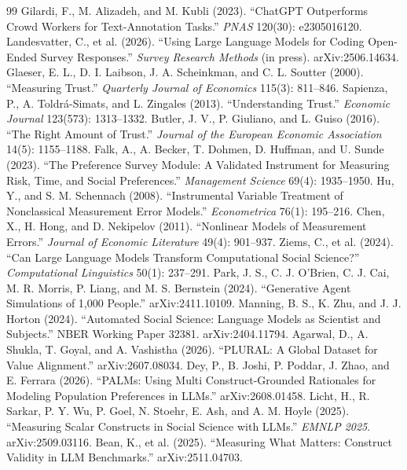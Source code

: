 \documentclass[10pt,letterpaper]{article}
\begin{document}
\begin{thebibliography}{99}
 Gilardi, F., M. Alizadeh, and M. Kubli (2023). ``ChatGPT Outperforms Crowd Workers for Text-Annotation Tasks.'' \textit{PNAS} 120(30): e2305016120.
 Landesvatter, C., et al. (2026). ``Using Large Language Models for Coding Open-Ended Survey Responses.'' \textit{Survey Research Methods} (in press). arXiv:2506.14634.
 Glaeser, E. L., D. I. Laibson, J. A. Scheinkman, and C. L. Soutter (2000). ``Measuring Trust.'' \textit{Quarterly Journal of Economics} 115(3): 811--846.
 Sapienza, P., A. Toldr\'a-Simats, and L. Zingales (2013). ``Understanding Trust.'' \textit{Economic Journal} 123(573): 1313--1332.
 Butler, J. V., P. Giuliano, and L. Guiso (2016). ``The Right Amount of Trust.'' \textit{Journal of the European Economic Association} 14(5): 1155--1188.
 Falk, A., A. Becker, T. Dohmen, D. Huffman, and U. Sunde (2023). ``The Preference Survey Module: A Validated Instrument for Measuring Risk, Time, and Social Preferences.'' \textit{Management Science} 69(4): 1935--1950.
 Hu, Y., and S. M. Schennach (2008). ``Instrumental Variable Treatment of Nonclassical Measurement Error Models.'' \textit{Econometrica} 76(1): 195--216.
 Chen, X., H. Hong, and D. Nekipelov (2011). ``Nonlinear Models of Measurement Errors.'' \textit{Journal of Economic Literature} 49(4): 901--937.
 Ziems, C., et al. (2024). ``Can Large Language Models Transform Computational Social Science?'' \textit{Computational Linguistics} 50(1): 237--291.
 Park, J. S., C. J. O'Brien, C. J. Cai, M. R. Morris, P. Liang, and M. S. Bernstein (2024). ``Generative Agent Simulations of 1,000 People.'' arXiv:2411.10109.
 Manning, B. S., K. Zhu, and J. J. Horton (2024). ``Automated Social Science: Language Models as Scientist and Subjects.'' NBER Working Paper 32381. arXiv:2404.11794.
 Agarwal, D., A. Shukla, T. Goyal, and A. Vashistha (2026). ``PLURAL: A Global Dataset for Value Alignment.'' arXiv:2607.08034.
 Dey, P., B. Joshi, P. Poddar, J. Zhao, and E. Ferrara (2026). ``PALMs: Using Multi Construct-Grounded Rationales for Modeling Population Preferences in LLMs.'' arXiv:2608.01458.
 Licht, H., R. Sarkar, P. Y. Wu, P. Goel, N. Stoehr, E. Ash, and A. M. Hoyle (2025). ``Measuring Scalar Constructs in Social Science with LLMs.'' \textit{EMNLP 2025}. arXiv:2509.03116.
 Bean, K., et al. (2025). ``Measuring What Matters: Construct Validity in LLM Benchmarks.'' arXiv:2511.04703.

\end{thebibliography}
\end{document}
